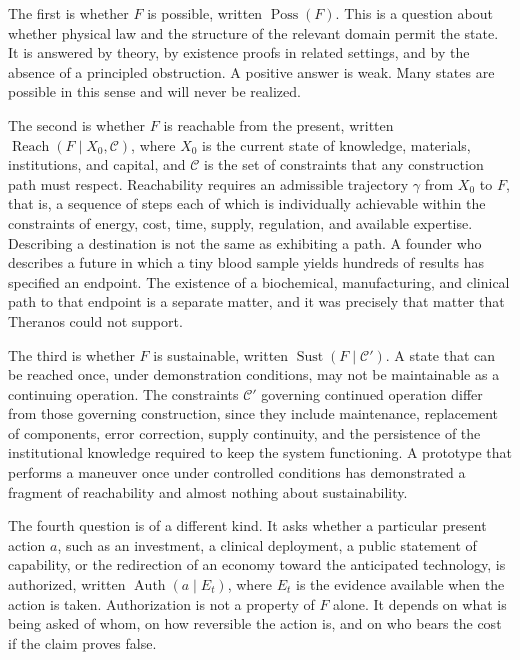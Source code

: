 \documentclass[11pt]{article}
\theoremstyle{plain}
\theoremstyle{definition}
\theoremstyle{remark}
\newcommand{\Auth}{\operatorname{Auth}}
\newcommand{\Poss}{\operatorname{Poss}}
\newcommand{\Reach}{\operatorname{Reach}}
\newcommand{\Sust}{\operatorname{Sust}}
\begin{document}
The first is whether $F$ is possible, written $\Poss(F)$. This is a question about whether physical law and the structure of the relevant domain permit the state. It is answered by theory, by existence proofs in related settings, and by the absence of a principled obstruction. A positive answer is weak. Many states are possible in this sense and will never be realized.

The second is whether $F$ is reachable from the present, written $\Reach(F \mid X_0, \mathcal{C})$, where $X_0$ is the current state of knowledge, materials, institutions, and capital, and $\mathcal{C}$ is the set of constraints that any construction path must respect. Reachability requires an admissible trajectory $\gamma$ from $X_0$ to $F$, that is, a sequence of steps each of which is individually achievable within the constraints of energy, cost, time, supply, regulation, and available expertise. Describing a destination is not the same as exhibiting a path. A founder who describes a future in which a tiny blood sample yields hundreds of results has specified an endpoint. The existence of a biochemical, manufacturing, and clinical path to that endpoint is a separate matter, and it was precisely that matter that Theranos could not support.

The third is whether $F$ is sustainable, written $\Sust(F \mid \mathcal{C}')$. A state that can be reached once, under demonstration conditions, may not be maintainable as a continuing operation. The constraints $\mathcal{C}'$ governing continued operation differ from those governing construction, since they include maintenance, replacement of components, error correction, supply continuity, and the persistence of the institutional knowledge required to keep the system functioning. A prototype that performs a maneuver once under controlled conditions has demonstrated a fragment of reachability and almost nothing about sustainability.

The fourth question is of a different kind. It asks whether a particular present action $a$, such as an investment, a clinical deployment, a public statement of capability, or the redirection of an economy toward the anticipated technology, is authorized, written $\Auth(a \mid E_t)$, where $E_t$ is the evidence available when the action is taken. Authorization is not a property of $F$ alone. It depends on what is being asked of whom, on how reversible the action is, and on who bears the cost if the claim proves false.
\end{document}
